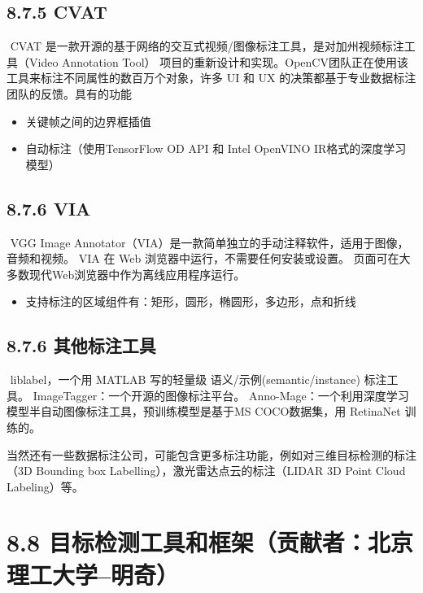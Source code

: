 \subsection{8.7.5 CVAT}\label{cvat}

​ CVAT
是一款开源的基于网络的交互式视频/图像标注工具，是对加州视频标注工具（Video
Annotation Tool）
项目的重新设计和实现。OpenCV团队正在使用该工具来标注不同属性的数百万个对象，许多
UI 和 UX 的决策都基于专业数据标注团队的反馈。具有的功能

\begin{itemize}
\item
  关键帧之间的边界框插值
\item
  自动标注（使用TensorFlow OD API 和 Intel OpenVINO
  IR格式的深度学习模型）
\end{itemize}

\subsection{8.7.6 VIA}\label{via}

​ VGG Image
Annotator（VIA）是一款简单独立的手动注释软件，适用于图像，音频和视频。
VIA 在 Web 浏览器中运行，不需要任何安装或设置。
页面可在大多数现代Web浏览器中作为离线应用程序运行。

\begin{itemize}
\item
  支持标注的区域组件有：矩形，圆形，椭圆形，多边形，点和折线
\end{itemize}

\subsection{8.7.6
其他标注工具}\label{ux5176ux4ed6ux6807ux6ce8ux5de5ux5177}

​ liblabel，一个用 MATLAB 写的轻量级 语义/示例(semantic/instance)
标注工具。 ImageTagger：一个开源的图像标注平台。
Anno-Mage：一个利用深度学习模型半自动图像标注工具，预训练模型是基于MS
COCO数据集，用 RetinaNet 训练的。

 ​
当然还有一些数据标注公司，可能包含更多标注功能，例如对三维目标检测的标注（3D
Bounding box Labelling），激光雷达点云的标注（LIDAR 3D Point Cloud
Labeling）等。

\section{8.8
目标检测工具和框架（贡献者：北京理工大学--明奇）}\label{ux76eeux6807ux68c0ux6d4bux5de5ux5177ux548cux6846ux67b6ux8d21ux732eux8005ux5317ux4eacux7406ux5de5ux5927ux5b66ux660eux5947}


